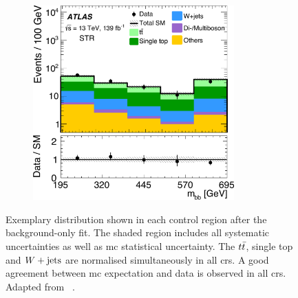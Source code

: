 \begin{figure}
\begin{subfigure}[b]{0.5\linewidth}
		\centering\includegraphics[width=0.85\textwidth]{fig_02e_yellow}
	\end{subfigure}\hfill

	\caption{Exemplary distribution shown in each control region after the background-only fit. The shaded region includes all systematic uncertainties as well as \gls{mc} statistical uncertainty. The $t\bar{t}$, single top and $W+\mathrm{jets}$ are normalised simultaneously in all \glspl{cr}. A good agreement between \gls{mc} expectation and data is observed in all \glspl{cr}. Adapted from ~\cite{SUSY-2019-08}.}
	\label{fig:CR_distributions_postfit}
\end{figure}



